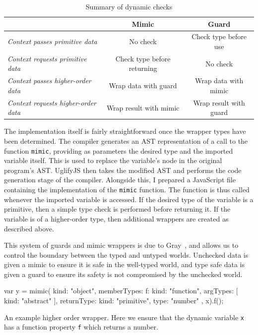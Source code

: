 \documentclass[12pt,a4paper,twoside,openright]{report}
\theoremstyle{definition}
\theoremstyle{dotless}
\begin{document}
\begin{table}[h]
  \begin{tabular}{@{}lcc@{}}
	\toprule
    & \textbf{Mimic} & \textbf{Guard}               \\ \midrule
	\textit{Context passes primitive data}   & No check & Check type before use        \\
	\textit{Context requests primitive data} & Check type before returning & No check \\
	\textit{Context passes higher-order data} & Wrap data with guard & Wrap data with mimic \\
	\textit{Context requests higher-order data} & Wrap result with mimic & Wrap result with guard \\

	\bottomrule
  \end{tabular}
  \caption{Summary of dynamic checks}
  \label{tbl:chkSummary}
\end{table}
The implementation itself is fairly straightforward once the wrapper types 
have been determined. The compiler generates an AST representation of a
call to the function \texttt{mimic}, providing as parameters 
the desired type and the imported variable itself. This is used to replace the 
variable's node in the original program's AST. UglifyJS then takes the modified AST and 
performs the code generation stage of the compiler. Alongside this, I prepared
a JavaScript file containing the implementation of the \texttt{mimic} function. 
The function is thus called whenever the imported variable is accessed. If the
desired type of the variable is a primitive, then a simple type check is performed 
before returning it. If the variable is of a higher-order type, then additional
wrappers are created as described above.

This system of guards and mimic wrappers is due to
Gray~\cite{gradGray,gray2005fine}, and allows us to control the boundary between the typed
and untyped worlds. Unchecked data is given a mimic to ensure it is safe in the
well-typed world, and type safe data is given a guard to ensure its safety is
not compromised by the unchecked world.

\begin{listing}
  \begin{jscript}
	var y = mimic({
	  kind: "object",
	  memberTypes: {
	    f: {
	      kind: "function",
	      argTypes: [ {
	        kind: "abstract"
	      } ],
	      returnType: {
	        kind: "primitive",
	        type: "number"
	      }
	    }
	  }
	}, x).f();
  \end{jscript}
  \caption[An example higher order wrapper]{An example higher order wrapper. Here we ensure that the
  	dynamic variable \texttt{x} has a function property \texttt{f} which returns a number.}
  \label{lst:importPrim}
\end{listing}
\end{document}
